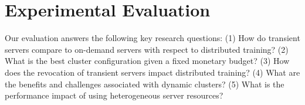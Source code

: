 \section{Experimental Evaluation}
\label{sec:exp}




Our evaluation answers the following key research questions:
(1) How do transient servers compare to on-demand servers with respect to distributed training? 
(2) What is the best cluster configuration given a fixed monetary budget?
(3) How does the revocation of transient servers impact distributed training? 
(4) What are the benefits and challenges associated with dynamic clusters? 
(5) What is the performance impact of using heterogeneous server resources? 


